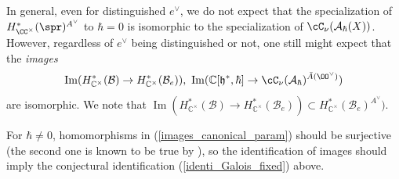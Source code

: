 \documentclass[12pt]{amsart}
\begin{document}




In general, even for distinguished $e^\vee$, we do not expect that the specialization of $ H^{*}_{\CC^\times}(\spr)^{A^\vee}$ to $\hbar=0$ is isomorphic to the specialization of $\cC_\nu(\mathcal{A}_\hbar(X))$. However, regardless of $e^\vee$ being distinguished or not, one still might expect that the {\emph{images}}
\begin{equation}\label{images_canonical_param}
\operatorname{Im}(H^*_{\mathbb{C}^\times}(\mathcal{B}) \rightarrow H^*_{\mathbb{C}^\times}(\mathcal{B}_e)),~\operatorname{Im}(\mathbb{C}[\mathfrak{h}^*,\hbar] \rightarrow \cC_\nu(\mathcal{A}_\hbar)^{\Bar{A}(\OO^\vee)})
\end{equation}
are isomorphic. We note that $\operatorname{Im}(H^*_{\mathbb{C}^\times}(\mathcal{B}) \rightarrow H^*_{\mathbb{C}^\times}(\mathcal{B}_e)) \subset H^*_{\mathbb{C}^\times}(\mathcal{B}_e)^{A^\vee})$. 

For $\hbar \neq 0$, homomorphisms in (\ref{images_canonical_param}) should be surjective (the second one is known to be true by \cite[Corollary 6.5.6]{LMBM}), 
so the identification of images should imply the conjectural identification (\ref{identi_Galois_fixed}) above.


\end{document}
